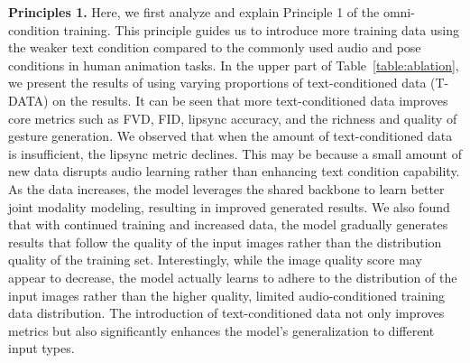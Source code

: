 \textbf{Principles 1. } 
Here, we first analyze and explain Principle 1 of the omni-condition training. This principle guides us to introduce more training data using the weaker text condition compared to the commonly used audio and pose conditions in human animation tasks. In the upper part of Table~\ref{table:ablation}, we present the results of using varying proportions of text-conditioned data (T-DATA) on the results. It can be seen that more text-conditioned data improves core metrics such as FVD, FID, lipsync accuracy, and the richness and quality of gesture generation. We observed that when the amount of text-conditioned data is insufficient, the lipsync metric declines. This may be because a small amount of new data disrupts audio learning rather than enhancing text condition capability. As the data increases, the model leverages the shared backbone to learn better joint modality modeling, resulting in improved generated results. We also found that with continued training and increased data, the model gradually generates results that follow the quality of the input images rather than the distribution quality of the training set. Interestingly, while the image quality score may appear to decrease, the model actually learns to adhere to the distribution of the input images rather than the higher quality, limited audio-conditioned training data distribution. The introduction of text-conditioned data not only improves metrics but also significantly enhances the model's generalization to different input types. 

